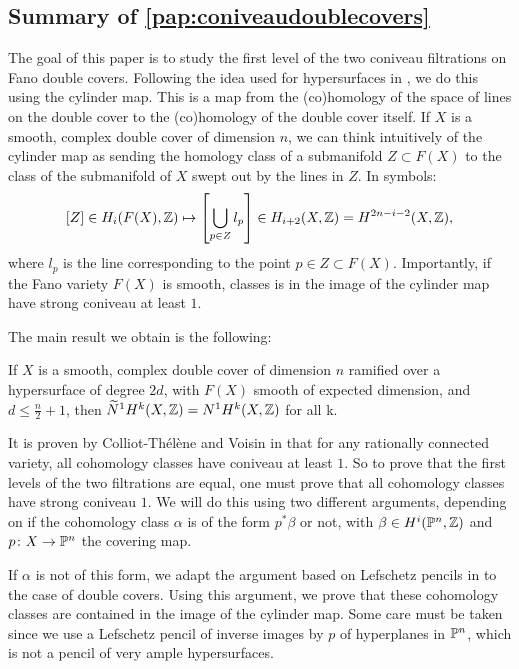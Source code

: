 \subsection{Summary of \cref{pap:coniveaudoublecovers}}
The goal of this paper is to study the first level of the two coniveau filtrations on Fano double covers. Following the idea used for hypersurfaces in \cite[Theorem 1.13]{VoisinConiveauThreefolds}, we do this using the cylinder map. This is a map from the (co)homology of the space of lines on the double cover to the (co)homology of the double cover itself. If $X$ is a smooth, complex double cover of dimension $n$, we can think intuitively of the cylinder map as sending the homology class of a submanifold $Z \subset F(X)$ to the class of the submanifold of $X$ swept out by the lines in $Z$. In symbols:
\[[Z] \in H_i(F(X),\Z) \mapsto \left[\bigcup_{p \in Z} l_p \right] \in H_{i+2}(X,\Z) = H^{2n-i-2}(X,\Z), \]
where $l_p$ is the line corresponding to the point $p \in Z \subset F(X)$. Importantly, if the Fano variety $F(X)$ is smooth, classes is in the image of the cylinder map have strong coniveau at least $1$.

The main result we obtain is the following:
\begin{theorem}
	\label{thm:ConiveauIntroductionSection}
	If $X$ is a smooth, complex double cover of dimension $n$ ramified over a hypersurface of degree $2d$, with $F(X)$ smooth of expected dimension, and $d \leq \frac{n}{2}+1$, then $\widetilde{N}^1H^k(X,\Z) = N^1H^k(X,\Z)$ for all k.
\end{theorem}

It is proven by Colliot-Thélène and Voisin in \cite{ColliotTheleneVoisinIntegralHodge} that for any rationally connected variety, all cohomology classes have coniveau at least $1$. So to prove that the first levels of the two filtrations are equal, one must prove that all cohomology classes have strong coniveau $1$. We will do this using two different arguments, depending on if the cohomology class $\alpha$ is of the form $p^*\beta$ or not, with $\beta \in H^i(\P^n,\Z)$ and $p \from X \to \P^n$ the covering map.

If $\alpha$ is not of this form, we adapt the argument based on Lefschetz pencils in \cite{VoisinConiveauThreefolds} to the case of double covers. Using this argument, we prove that these cohomology classes are contained in the image of the cylinder map. Some care must be taken since we use a Lefschetz pencil of inverse images by $p$ of hyperplanes in $\P^n$, which is not a pencil of very ample hypersurfaces.

